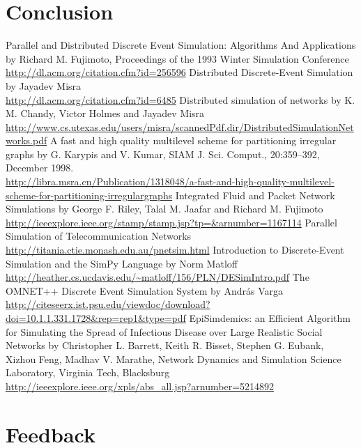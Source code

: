 \documentclass[12pt,a4paper]{article}
\begin{document}
\section{Conclusion}

\begin{thebibliography}{99}
Parallel and Distributed Discrete Event Simulation: Algorithms And Applications by Richard M. Fujimoto, Proceedings of the 1993 Winter Simulation Conference
\\ \url{http://dl.acm.org/citation.cfm?id=256596}
Distributed Discrete-Event Simulation by Jayadev Misra
\\ \url{http://dl.acm.org/citation.cfm?id=6485}
Distributed simulation of networks by K. M. Chandy, Victor Holmes and Jayadev Misra
\\ \url{http://www.cs.utexas.edu/users/misra/scannedPdf.dir/DistributedSimulationNetworks.pdf}
A fast and high quality multilevel scheme for partitioning irregular graphs by G. Karypis and V. Kumar, SIAM J. Sci. Comput., 20:359–392, December 1998.
\\ \url{http://libra.msra.cn/Publication/1318048/a-fast-and-high-quality-multilevel-scheme-for-partitioning-irregulargraphs}
Integrated Fluid and Packet Network Simulations by George F. Riley, Talal M. Jaafar and Richard M. Fujimoto
\\ \url{http://ieeexplore.ieee.org/stamp/stamp.jsp?tp=&arnumber=1167114}
Parallel Simulation of Telecommunication Networks \url{http://titania.ctie.monash.edu.au/pnetsim.html}
Introduction to Discrete-Event Simulation and the SimPy Language by Norm Matloff
\\ \url{http://heather.cs.ucdavis.edu/~matloff/156/PLN/DESimIntro.pdf}
The OMNET++ Discrete Event Simulation System by András Varga
\\ \url{http://citeseerx.ist.psu.edu/viewdoc/download?doi=10.1.1.331.1728&rep=rep1&type=pdf}
EpiSimdemics: an Efficient Algorithm for Simulating the Spread of Infectious Disease over Large Realistic Social Networks by Christopher L. Barrett, Keith R. Bisset, Stephen G. Eubank, Xizhou Feng, Madhav V. Marathe, Network Dynamics and Simulation Science Laboratory, Virginia Tech, Blacksburg
\\ \url{http://ieeexplore.ieee.org/xpls/abs_all.jsp?arnumber=5214892}
\end{thebibliography}

\section{Feedback}
\end{document}
